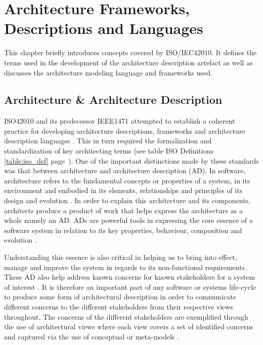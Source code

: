\chapter{Architecture Frameworks, Descriptions and Languages}

This chapter briefly introduces concepts covered by ISO/IEC42010. It defines the terms used in the development of the architecture description artefact as well as discusses the architecture modeling language and frameworks used.


\section{Architecture \& Architecture Description}


ISO42010 and its predecessor IEEE1471 attempted to establish a coherent practice for developing architecture descriptions, frameworks and architecture description languages \cite{InternationalOrganizationOfStandardization2011}. This in turn required the formalization and standardization of key architecting terms (see table ISO Definitions \ref{table:iso_def} page~\pageref{table:iso_def}). One of the important distinctions made by these standards was that between architecture and architecture description (AD). In software, architecture refers to the fundamental concepts or properties of a system, in its environment and embodied in its elements, relationships and principles of its design and evolution \cite{InternationalOrganizationOfStandardization2011}. In order to explain this architecture and its components, architects produce a product of work that helps express the architecture as a whole namely an AD. ADs are powerful tools in expressing the core essence of a software system in relation to its key properties, behaviour, composition and evolution \cite{InternationalOrganizationOfStandardization2011}. 

Understanding this essence is also critical in helping us to bring into effect, manage and improve the system in regards to its non-functional requirements. These AD also help address known concerns for known stakeholders for a system of interest \cite{Emery2009}. It is therefore an important part of any software or systems life-cycle to produce some form of architectural description in order to communicate different concerns to the different stakeholders from their respective views throughout. The concerns of the different stakeholders are exemplified through the use of architectural views where each view covers a set of identified concerns and captured via the use of conceptual or meta-models \cite{42010faq}.


